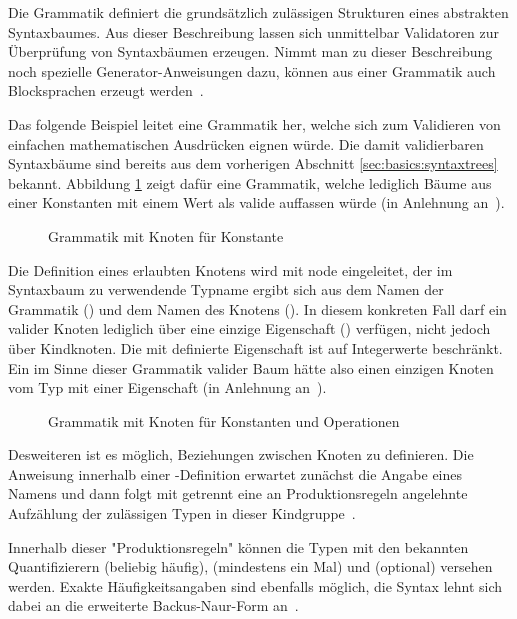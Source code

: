 Die Grammatik definiert die grundsätzlich zulässigen Strukturen eines abstrakten Syntaxbaumes. Aus dieser Beschreibung lassen sich unmittelbar Validatoren zur Überprüfung von Syntaxbäumen erzeugen. Nimmt man zu dieser Beschreibung noch spezielle Ge\-ne\-ra\-tor-An\-wei\-sung\-en dazu, können aus einer Grammatik auch Blocksprachen erzeugt werden~\cite[3]{riemer2018}.

Das folgende Beispiel leitet eine Grammatik her, welche sich zum Validieren von einfachen mathematischen Ausdrücken eignen würde. Die damit validierbaren Syntaxbäume sind bereits aus dem vorherigen Abschnitt \ref{sec:basics:syntaxtrees} bekannt. Abbildung \ref{fig:basics:grammars:1} zeigt dafür eine Grammatik, welche lediglich Bäume aus einer Konstanten mit einem Wert als valide auffassen würde (in Anlehnung an~\cite[6]{riemer2018}).

\begin{figure}[h]
  
  \caption{Grammatik mit Knoten für Konstante}
  \label{fig:basics:grammars:1}
\end{figure}

Die Definition eines erlaubten Knotens wird mit node eingeleitet, der im Syntaxbaum zu verwendende Typname ergibt sich aus dem Namen der Grammatik () und dem Namen des Knotens (). In diesem konkreten Fall darf ein valider Knoten lediglich über eine einzige Eigenschaft ()  verfügen, nicht jedoch über Kindknoten. Die mit  definierte Eigenschaft ist auf Integerwerte beschränkt. Ein im Sinne dieser Grammatik valider Baum hätte also einen einzigen Knoten vom Typ  mit einer Eigenschaft  (in Anlehnung an~\cite[6]{riemer2018}).

\begin{figure}[h]
  
  \caption{Grammatik mit Knoten für Konstanten und Operationen}
  \label{fig:basics:grammars:2}
\end{figure}

Desweiteren ist es möglich, Beziehungen zwischen Knoten zu definieren. Die Anweisung  innerhalb einer -De\-fi\-ni\-ti\-on erwartet zunächst die Angabe eines Namens und dann folgt mit \inlinec{::=} getrennt eine an Produktionsregeln angelehnte Aufzählung der zulässigen Typen in dieser Kindgruppe~\cite[6]{riemer2018}.

Innerhalb dieser "Produktionsregeln" können die Typen mit den bekannten Quantifizierern \inlinec{*} (beliebig häufig), \inlinec{+} (mindestens ein Mal) und  (optional) versehen werden. Exakte Häufigkeitsangaben sind ebenfalls möglich, die Syntax lehnt sich dabei an die erweiterte Backus-Naur-Form an~\cite[6]{riemer2018}.

